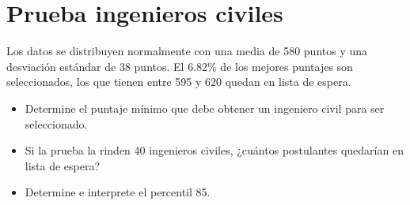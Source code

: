 \documentclass{article}
\begin{document}
\section{Prueba ingenieros civiles}
Los datos se distribuyen normalmente con una media de 580 puntos y una desviación estándar de 38 puntos. El 6.82\% de los mejores puntajes son seleccionados, los que tienen entre 595 y 620 quedan en lista de espera.

\begin{itemize}
  \item Determine el puntaje mínimo que debe obtener un ingeniero civil para ser seleccionado.
  \item Si la prueba la rinden 40 ingenieros civiles, ¿cuántos postulantes quedarían en lista de espera?
  \item Determine e interprete el percentil 85.
\end{itemize}
\end{document}

